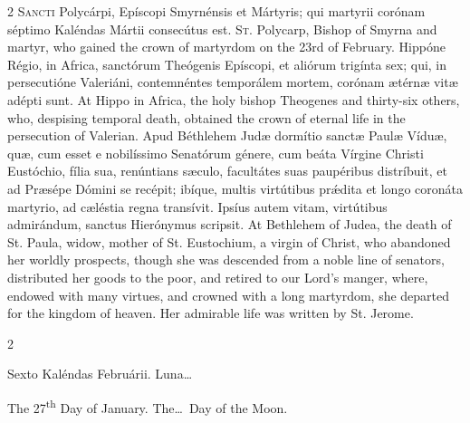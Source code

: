 \begin{paracol}{2}
\lettrine[lines=2]{S}{ancti} Polycárpi, Epíscopi Smyrnénsis et Mártyris; qui martyrii corónam 
 séptimo Kaléndas Mártii consecútus est.
\switchcolumn
{}
\lettrine[lines=2]{S}{t.} Polycarp, Bishop of Smyrna and martyr, who gained the crown of martyrdom 
 on the 23rd of February.
\switchcolumn*
{}
Hippóne Régio, in Africa, sanctórum Theógenis 
 Epíscopi, et aliórum trigínta sex; qui, in persecutióne Valeriáni, 
 contemnéntes temporálem mortem, corónam ætérnæ vitæ adépti sunt.
\switchcolumn
{}
At Hippo in Africa, the holy bishop Theogenes and thirty-six others, who, 
 despising temporal death, obtained the crown of eternal life in the 
 persecution of Valerian.
\switchcolumn*
{}
Apud Béthlehem Judæ dormítio sanctæ Paulæ Víduæ, 
 quæ, cum esset e nobilíssimo Senatórum génere, cum beáta Vírgine Christi 
 Eustóchio, fília sua, renúntians sæculo, facultátes suas paupéribus 
 distríbuit, et ad Præsépe Dómini se recépit; ibíque, multis virtútibus 
 prǽdita et longo coronáta martyrio, ad cæléstia regna transívit. 
 Ipsíus autem vitam, virtútibus admirándum, sanctus Hierónymus scripsit.
\switchcolumn
{}
At Bethlehem of Judea, the death of St. Paula, widow, mother of St. 
 Eustochium, a virgin of Christ, who abandoned her worldly prospects, though 
 she was descended from a noble line of senators, distributed her goods to 
 the poor, and retired to our Lord's manger, where, endowed with many 
 virtues, and crowned with a long martyrdom, she departed for the kingdom of 
 heaven. Her admirable life was written by St. Jerome.
\switchcolumn*
{}
\end{paracol}


\begin{paracol}{2}
\begin{center}{\color{gregoriocolor} Sexto Kaléndas Februárii. 
 Luna\dots\ }\end{center}
\switchcolumn
{}
\begin{center}{\color{gregoriocolor} The 27\textsuperscript{th} Day of 
 January. The\dots\ Day of the Moon.}\end{center}
\end{paracol}

